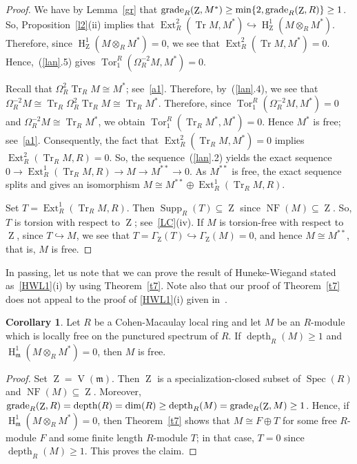 \documentclass[11pt]{amsart}
\theoremstyle{definition}
\newtheorem{cor}[thm]{Corollary}
\theoremstyle{definition}
\numberwithin{equation}{section}
\newcommand{\fm}{\mathfrak{m}}
\DeclareMathOperator{\gr}{\textnormal{grade}}
\DeclareMathOperator{\Tr}{Tr}
\DeclareMathOperator{\V}{V}
\DeclareMathOperator{\mz}{Z}
\DeclareMathOperator{\depth}{depth}
\DeclareMathOperator{\Ext}{Ext}
\DeclareMathOperator{\hh}{H}
\DeclareMathOperator{\Supp}{Supp}
\DeclareMathOperator{\Spec}{Spec}
\DeclareMathOperator{\Tor}{Tor}
\DeclareMathOperator{\NF}{NF}
\begin{document}
\begin{proof} We have by Lemma~\ref{gr} that $\gr_R(\mz,M^*)\geq\min\{2,\gr_R(\mz,R)\}\geq1$. So, Proposition~\ref{l2}(ii) implies that $\Ext^2_R(\Tr M,M^*) \hookrightarrow \hh^1_{\mz}(M\otimes_RM^*)$. Therefore, since $\hh^1_{\mz}(M\otimes_RM^*)=0$, we see that $\Ext^2_R(\Tr M,M^*)=0$. Hence,~(\ref{lan}.5) gives $\Tor_1^R(\Omega_R^{-2}M,M^{\ast})=0$.

Recall that $\Omega_R^2\Tr_R M \cong M^{\ast}$; see~\ref{a1}. Therefore, by~(\ref{lan}.4), we see that $\Omega_R^{-2}M \cong \Tr_R \Omega_R^2 \Tr_R M \cong \Tr_R M^*$. Therefore, since $\Tor_1^R(\Omega_R^{-2}M,M^{\ast})=0$ and $\Omega_R^{-2}M \cong \Tr_R M^*$, we obtain $\Tor_1^R(\Tr_R M^*,M^*)=0$. Hence $M^{\ast}$ is free; see~\ref{a1}. Consequently, the fact that $\Ext^2_R(\Tr_R M,M^*)=0$ implies $\Ext^2_R(\Tr_R M,R)=0$. So, the sequence~(\ref{lan}.2) yields the exact sequence $0\rightarrow\Ext^1_R(\Tr_R M,R)\rightarrow M\rightarrow M^{**}\rightarrow0$. 
As $M^{**}$ is free, the exact sequence splits and gives an isomorphism $M\cong M^{\ast\ast}\oplus \Ext^1_R(\Tr_R M,R)$. 

Set $T=\Ext^1_R(\Tr_R M,R)$. Then $\Supp_R(T)\subseteq \mz$ since $\NF(M)\subseteq\mz$. So, $T$ is torsion with respect to $\mz$; see~\ref{LC}(iv). If $M$ is torsion-free with respect to $\mz$, since $T \hookrightarrow M$, we see that $T=\Gamma_{\mz}(T)\hookrightarrow \Gamma_{\mz}(M)=0$, and hence $M \cong M^{\ast\ast}$, that is, $M$ is free.
\end{proof}

In passing, let us note that we can prove the result of Huneke-Wiegand stated as~\ref{HWL1}(i) by using Theorem~\ref{t7}. Note also that our proof of Theorem~\ref{t7} does not appeal to the proof of \ref{HWL1}(i) given in~\cite{HW2}. 

\begin{cor}\label{c1} Let $R$ be a Cohen-Macaulay local ring and let $M$ be an $R$-module which is locally free on the punctured spectrum of $R$. If $\depth_R(M)\geq 1$ and $\hh^1_{\fm}(M\otimes_RM^*)=0$, then $M$ is free.
\end{cor}

\begin{proof} Set $\mz=\V(\fm)$. Then $\mz$ is a specialization-closed subset of $\Spec(R)$ and $\NF(M)\subseteq\mz$. Moreover, $\gr_R(\mz,R)=\depth(R)=\dim(R)\geq \depth_R(M)=\gr_R(\mz,M)\geq 1$. Hence, if $\hh^1_{\fm}(M\otimes_RM^*)=0$, then Theorem~\ref{t7} shows that $M \cong F\oplus T$ for some free $R$-module $F$ and some finite length $R$-module $T$; in that case, $T=0$ since $\depth_R(M)\geq 1$. This proves the claim.
\end{proof}
\end{document}
